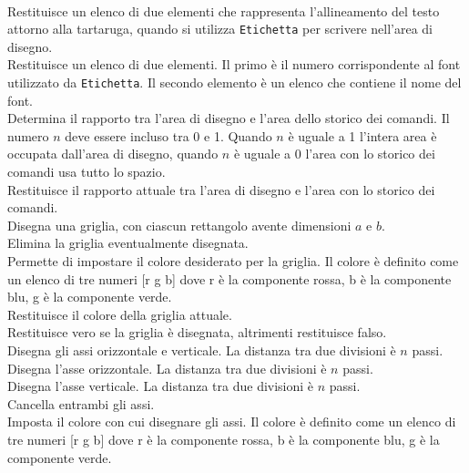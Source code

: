 \hspace{0cm}\\
 Restituisce un elenco di due elementi che rappresenta l'allineamento del testo attorno alla tartaruga, quando si utilizza \texttt{Etichetta} per scrivere nell'area di disegno.\\
 Restituisce un elenco di due elementi. Il primo è il numero corrispondente al font utilizzato da \texttt{Etichetta}. Il secondo elemento è un elenco che contiene il nome del font.\\
 Determina il rapporto tra l'area di disegno e l'area dello storico dei comandi. Il numero $n$ deve essere incluso tra 0 e 1. Quando $n$ è uguale a 1 l'intera area è occupata dall'area di disegno, quando $n$ è uguale a 0 l'area con lo storico dei comandi usa tutto lo spazio.\\
 Restituisce il rapporto attuale tra l'area di disegno e l'area con lo storico dei comandi.\\
 Disegna una griglia, con ciascun rettangolo avente dimensioni $a$ e $b$.\\
 Elimina la griglia eventualmente disegnata.\\
 Permette di impostare il colore desiderato per la griglia. Il colore è definito come un elenco di tre numeri [r g b] dove r è la componente rossa, b è la componente blu, g è la componente verde.\\
 Restituisce il colore della griglia attuale.\\
 Restituisce vero se la griglia è disegnata, altrimenti restituisce falso.\\
 Disegna gli assi orizzontale e verticale. La distanza tra due divisioni è $n$ passi. \\
 Disegna l'asse orizzontale. La distanza tra due divisioni è $n$ passi.\\
 Disegna l'asse verticale. La distanza tra due divisioni è $n$ passi.\\
 Cancella entrambi gli assi.\\
 Imposta il colore con cui disegnare gli assi. Il colore è definito come un elenco di tre numeri [r g b] dove r è la componente rossa, b è la componente blu, g è la componente verde. \\

